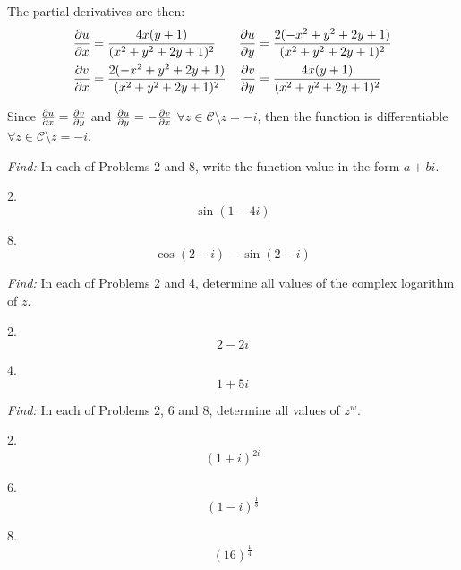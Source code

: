 \documentclass[11pt]{homework}
\begin{document}
The partial derivatives are then:
\begin{align*}
  \pdv{u}{x} &= \frac{4x(y+1)}{(x^2+y^2+2y+1)^2}           & \pdv{u}{y} &= \frac{2(-x^2 + y^2 +2y+1)}{(x^2+y^2+2y+1)^2} \\
  \pdv{v}{x} &=  \frac{2(-x^2+y^2+2y+1)}{(x^2+y^2+2y+1)^2} & \pdv{v}{y} &= \frac{4x(y+1)}{(x^2+y^2+2y+1)^2}
\end{align*}

Since $\pdv{u}{x}=\pdv{v}{y}$ and $\pdv{u}{y}=-\pdv{v}{x}$ 
$\forall z \in \mathcal{C} \setminus z = -i$,
then the function is differentiable $ \forall z \in \mathcal{C} \setminus z=-i$.


\emph{Find:}
\newline
In each of Problems 2 and 8,
write the function value in the form
$a+bi$.

2.
\begin{equation*}
  \sin (1-4i)
\end{equation*}

8.
\begin{equation*}
  \cos (2-i) - \sin ( 2-i)
\end{equation*}



\emph{Find:}
In each of Problems 2 and 4,
determine all values of the 
complex logarithm of $z$.

2. 
\begin{equation*}
  2 - 2i
\end{equation*}

4. 
\begin{equation*}
  1 + 5i
\end{equation*}

\emph{Find:}
In each of Problems 2, 6 and 8,
determine all values of $z^w$.

2.
\begin{equation*}
  (1+i)^{2i}
\end{equation*}

6.
\begin{equation*}
  (1-i)^{\frac{1}{3}}
\end{equation*}

8.
\begin{equation*}
  (16)^{\frac{1}{4}}
\end{equation*}
\end{document}
